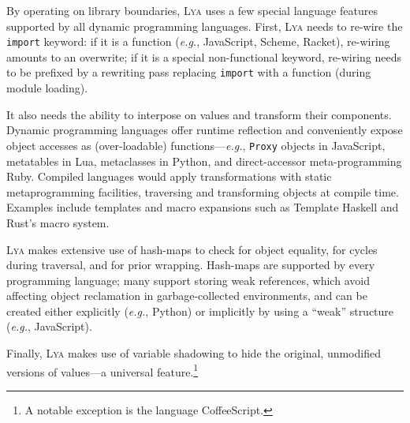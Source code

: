 \documentclass[letterpaper,twocolumn,10pt]{article}
\def\eg{{\em e.g.}, }
\def\ie{{\em i.e.}, }
\newcommand{\ttt}[1]{\texttt{#1}}
\newcommand{\sys}{{\scshape Lya}\xspace}
\begin{document}
By operating on library boundaries, \sys uses a few special language features supported by all dynamic programming languages.
First, \sys needs to re-wire the \ttt{import} keyword:
  if it is a function (\eg JavaScript, Scheme, Racket), re-wiring amounts to an overwrite;
  if it is a special non-functional keyword, re-wiring needs to be prefixed by a rewriting pass replacing \ttt{import} with a function (during module loading).

It also needs the ability to interpose on values and transform their components.
Dynamic programming languages offer runtime reflection and conveniently expose object accesses as (over-loadable) functions---\eg \ttt{Proxy} objects in JavaScript, metatables in Lua, metaclasses in Python, and direct-accessor meta-programming Ruby.
Compiled languages would apply transformations with static metaprogramming facilities, traversing and transforming objects at compile time.
Examples include templates and macro expansions such as Template Haskell and Rust's macro system.

\sys makes extensive use of hash-maps to check for object equality, for cycles during traversal, and for prior wrapping.
Hash-maps are supported by every programming language; many support storing weak references, which avoid affecting object reclamation in garbage-collected environments, and can be created either explicitly (\eg Python) or implicitly by using a ``weak'' structure (\eg JavaScript).

Finally, \sys makes use of variable shadowing to hide the original, unmodified versions of values---a universal feature.\footnote{
  A notable exception is the language CoffeeScript. %
}
\end{document}
